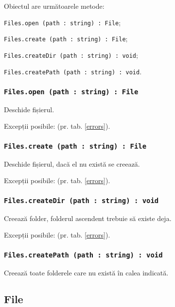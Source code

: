 Obiectul \files{} are următoarele metode:
\begin{icItems}
	\item \texttt{Files.open (path : string) : File};
	\item \texttt{Files.create (path : string) : File};
	\item \texttt{Files.createDir (path : string) : void};
	\item \texttt{Files.createPath (path : string) : void}.
\end{icItems}

\subsubsection{\texttt{Files.open (path : string) : File}}

Deschide fișierul.

Excepții posibile:  (pr. tab. \ref{errors}).

\subsubsection{\texttt{Files.create (path : string) : File}}

Deschide fișierul, dacă el nu există se creează.

Excepții posibile:  (pr. tab. \ref{errors}).

\subsubsection{\texttt{Files.createDir (path : string) : void}}

Creează folder, folderul ascendent trebuie să existe deja.

Excepții posibile:  (pr. tab. \ref{errors}).

\subsubsection{\texttt{Files.createPath (path : string) : void}}

Creează toate folderele care nu există în calea indicată.

\subsection{{\color{orange} File}}

